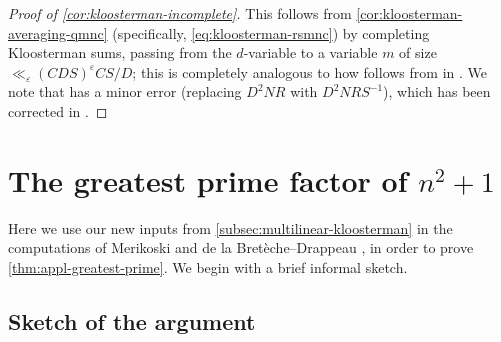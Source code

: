 \documentclass[reqno,11pt]{amsart}
\theoremstyle{remark}
\numberwithin{equation}{section}
\newcommand{\eps}{\varepsilon}
\begin{document}
\begin{proof}[Proof of \cref{cor:kloosterman-incomplete}]
This follows from \cref{cor:kloosterman-averaging-qmnc} (specifically, \cref{eq:kloosterman-rsmnc}) by completing Kloosterman sums, passing from the $d$-variable to a variable $m$ of size $\ll_\eps (CDS)^\eps CS/D$; this is completely analogous to how \cite[Theorem 12]{deshouillers1982kloosterman} follows from \cite[Theorem 11]{deshouillers1982kloosterman} in \cite[\S 9.2]{deshouillers1982kloosterman}. We note that \cite[Theorem 12]{deshouillers1982kloosterman} has a minor error (replacing $D^2 N R$ with $D^2 N R S^{-1}$), which has been corrected in \cite{bombieri2019some}.
\end{proof}





\section{The greatest prime factor of \texorpdfstring{$n^2+1$}{n\^2+1}} \label{sec:greatest-prime-factor}


Here we use our new inputs from \cref{subsec:multilinear-kloosterman} in the computations of Merikoski \cite{merikoski2023largest} and de la Bret\`eche--Drappeau \cite{de2020niveau}, in order to prove \cref{thm:appl-greatest-prime}. We begin with a brief informal sketch. 

\subsection{Sketch of the argument} \label{subsec:informal-overview-greatest}
\end{document}
